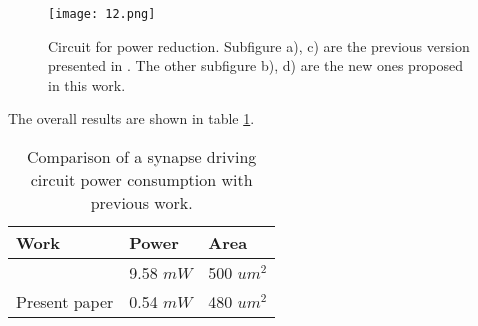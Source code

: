 \documentclass[review]{elsarticle}
\begin{document}
\begin{enumerate}
\end{enumerate}

\begin{figure}[!h]
\centering
\texttt{[image: 12.png]}
\caption{Circuit for power reduction. Subfigure a), c) are the previous version presented in \cite{prime2016}. The other subfigure b), d) are the new ones proposed in this work.}
\label{switch}
\end{figure}


The overall results  are  shown in table \ref{table:res2}.

\begin{table}[!h]
\centering
\caption{Comparison of a synapse driving circuit power consumption with previous work. }
\label{table:res2}
\begin{tabular}{|l|l|l|}
 \hline
Work &  Power & Area \\
 \hline
  \cite{prime2016} & 9.58 $mW$  & 500 $um^2$  \\
Present paper & 0.54 $mW$ & 480 $um^2$ \\

 \hline
 \end{tabular}
\end{table}
\end{document}

